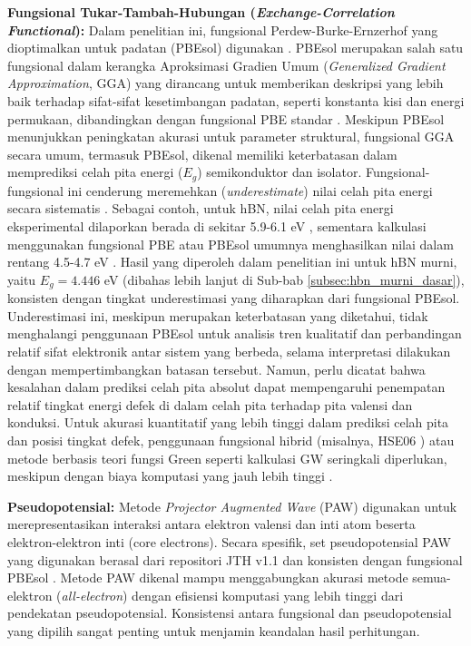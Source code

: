 \textbf{Fungsional Tukar-Tambah-Hubungan (\textit{Exchange-Correlation Functional}):}
Dalam penelitian ini, fungsional Perdew-Burke-Ernzerhof yang dioptimalkan untuk padatan (PBEsol) \cite{Perdew2008} digunakan \cite{[1, 1]}. PBEsol merupakan salah satu fungsional dalam kerangka Aproksimasi Gradien Umum (\textit{Generalized Gradient Approximation}, GGA) yang dirancang untuk memberikan deskripsi yang lebih baik terhadap sifat-sifat kesetimbangan padatan, seperti konstanta kisi dan energi permukaan, dibandingkan dengan fungsional PBE standar \cite{Perdew1996}. Meskipun PBEsol menunjukkan peningkatan akurasi untuk parameter struktural, fungsional GGA secara umum, termasuk PBEsol, dikenal memiliki keterbatasan dalam memprediksi celah pita energi ($E_g$) semikonduktor dan isolator. Fungsional-fungsional ini cenderung meremehkan (\textit{underestimate}) nilai celah pita energi secara sistematis \cite{[1, 1]}. Sebagai contoh, untuk hBN, nilai celah pita energi eksperimental dilaporkan berada di sekitar 5.9-6.1 eV \cite{[1], Watanabe2004, Elias2019}, sementara kalkulasi menggunakan fungsional PBE atau PBEsol umumnya menghasilkan nilai dalam rentang 4.5-4.7 eV \cite{[1, 1]}. Hasil yang diperoleh dalam penelitian ini untuk hBN murni, yaitu $E_g = 4.446$ eV (dibahas lebih lanjut di Sub-bab \ref{subsec:hbn_murni_dasar}), konsisten dengan tingkat underestimasi yang diharapkan dari fungsional PBEsol. Underestimasi ini, meskipun merupakan keterbatasan yang diketahui, tidak menghalangi penggunaan PBEsol untuk analisis tren kualitatif dan perbandingan relatif sifat elektronik antar sistem yang berbeda, selama interpretasi dilakukan dengan mempertimbangkan batasan tersebut. Namun, perlu dicatat bahwa kesalahan dalam prediksi celah pita absolut dapat mempengaruhi penempatan relatif tingkat energi defek di dalam celah pita terhadap pita valensi dan konduksi. Untuk akurasi kuantitatif yang lebih tinggi dalam prediksi celah pita dan posisi tingkat defek, penggunaan fungsional hibrid (misalnya, HSE06 \cite{Heyd2003, Heyd2006}) atau metode berbasis teori fungsi Green seperti kalkulasi GW \cite{Hedin1965} seringkali diperlukan, meskipun dengan biaya komputasi yang jauh lebih tinggi \cite{[1]}.

\textbf{Pseudopotensial:}
Metode \textit{Projector Augmented Wave} (PAW) \cite{Blochl1994, Kresse1999} digunakan untuk merepresentasikan interaksi antara elektron valensi dan inti atom beserta elektron-elektron inti (core electrons). Secara spesifik, set pseudopotensial PAW yang digunakan berasal dari repositori JTH v1.1 dan konsisten dengan fungsional PBEsol \cite{[1, 1]}. Metode PAW dikenal mampu menggabungkan akurasi metode semua-elektron (\textit{all-electron}) dengan efisiensi komputasi yang lebih tinggi dari pendekatan pseudopotensial. Konsistensi antara fungsional dan pseudopotensial yang dipilih sangat penting untuk menjamin keandalan hasil perhitungan.

